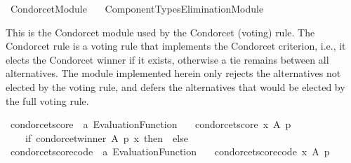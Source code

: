 %
\begin{isabellebody}%
%
%
\isadelimdocument
\isanewline
%
\endisadelimdocument
%
\isatagdocument
\isanewline
%
\isamarkuptrue%
%
\endisatagdocument
{\isafolddocument}%
%
\isadelimdocument
%
\endisadelimdocument
%
\isadelimtheory
%
\endisadelimtheory
%
\isatagtheory
{}\isamarkupfalse%
\ Condorcet{\isacharunderscore}{\kern0pt}Module\isanewline
\ \ \ {\isachardoublequoteopen}Component{\isacharunderscore}{\kern0pt}Types{\isacharslash}{\kern0pt}Elimination{\isacharunderscore}{\kern0pt}Module{\isachardoublequoteclose}\isanewline
{}%
\endisatagtheory
{\isafoldtheory}%
%
\isadelimtheory
%
\endisadelimtheory
%
\begin{isamarkuptext}%
This is the Condorcet module used by the Condorcet (voting) rule. The Condorcet
rule is a voting rule that implements the Condorcet criterion, i.e., it elects
the Condorcet winner if it exists, otherwise a tie remains between all
alternatives. The module implemented herein only rejects the alternatives not
elected by the voting rule, and defers the alternatives that would be elected
by the full voting rule.%
\end{isamarkuptext}\isamarkuptrue%
%
\isadelimdocument
%
\endisadelimdocument
%
\isatagdocument
%
\isamarkuptrue%
%
\endisatagdocument
{\isafolddocument}%
%
\isadelimdocument
%
\endisadelimdocument
{}\isamarkupfalse%
\ condorcet{\isacharunderscore}{\kern0pt}score\ {\isacharcolon}{\kern0pt}{\isacharcolon}{\kern0pt}\ {\isachardoublequoteopen}{\isacharprime}{\kern0pt}a\ Evaluation{\isacharunderscore}{\kern0pt}Function{\isachardoublequoteclose}\ \isanewline
\ \ {\isachardoublequoteopen}condorcet{\isacharunderscore}{\kern0pt}score\ x\ A\ p\ {\isacharequal}{\kern0pt}\isanewline
\ \ \ \ {\isacharparenleft}{\kern0pt}if\ {\isacharparenleft}{\kern0pt}condorcet{\isacharunderscore}{\kern0pt}winner\ A\ p\ x{\isacharparenright}{\kern0pt}\ then\ {}\ else\ {}{\isacharparenright}{\kern0pt}{\isachardoublequoteclose}\isanewline
\isanewline
{}\isamarkupfalse%
\ condorcet{\isacharunderscore}{\kern0pt}score{\isacharunderscore}{\kern0pt}code\ {\isacharcolon}{\kern0pt}{\isacharcolon}{\kern0pt}\ {\isachardoublequoteopen}{\isacharprime}{\kern0pt}a\ Evaluation{\isacharunderscore}{\kern0pt}Function{\isachardoublequoteclose}\ \isanewline
\ \ {\isachardoublequoteopen}condorcet{\isacharunderscore}{\kern0pt}score{\isacharunderscore}{\kern0pt}code\ x\ A\ p\ {\isacharequal}{\kern0pt}\isanewline

\end{isabellebody}
